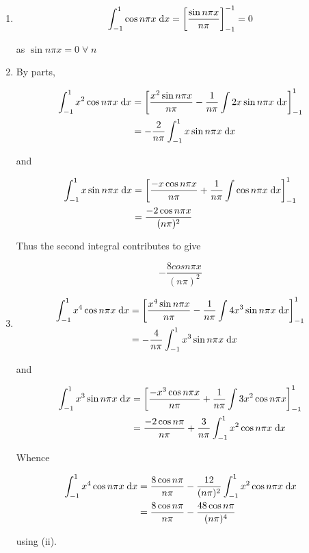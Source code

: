 \documentclass[a4paper]{article}
\begin{document}
\begin{enumerate}
	\item  \[ \int_{-1}^{1} \cos  n \pi x   \; \mathrm{d} x = \left[ \frac{\sin n \pi x}{n \pi} \right]_{-1}^{-1} = 0  \]
	
	as $ \sin n \pi x = 0 \; \forall \; n $
	
	\item By parts, 
	
	\begin{align*}
	\int_{-1}^{1} x^{2} \cos  n \pi x   \; \mathrm{d} x & = \left[ \frac{x^{2} \sin n \pi x}{n \pi} - \frac{1}{n \pi }\int 2x \sin n \pi x \; \mathrm{d} x \right]_{-1}^{1}  \\
	& = - \frac{2}{n \pi} \int_{-1}^{1} x \sin n \pi x \; \mathrm{d} x
	\end{align*}
	
	and
	
	\begin{align*}
	\int_{-1}^{1} x \sin n \pi x \; \mathrm{d} x & = \left[  \frac{- x \cos n \pi x}{n \pi} + \frac{1}{n \pi} \int \cos n \pi x \; \mathrm{d} x   \right]_{-1}^{1}  \\
	& = \frac{-2 \cos n \pi x }{(n \pi )^{2}}
	\end{align*}
	
	Thus the second integral contributes to give
	
	\[ - \frac{8 cos n \pi x}{(n \pi)^{2}} \]
	
	
	\item 
	
	\begin{align*}
	\int_{-1}^{1} x^{4} \cos  n \pi x  \; \mathrm{d} x & = \left[ \frac{x^{4} \sin n \pi x}{n \pi} - \frac{1}{n \pi }\int 4x^{3} \sin n \pi x \; \mathrm{d} x  \right]_{-1}^{1} \\
	& = - \frac{4}{n \pi} \int_{-1}^{1} x^{3} \sin n \pi x \; \mathrm{d} x
	\end{align*}
	
	and 
	
	\begin{align*}
	\int_{-1}^{1} x^{3} \sin n \pi x \; \mathrm{d} x & = \left[ \frac{-x^{3} \cos n \pi x}{n \pi} + \frac{1}{n \pi} \int 3 x^{2} \cos n \pi x \right]_{-1}^{1}  \\
	& = \frac{-2 \cos n \pi}{n \pi} + \frac{3}{n \pi} \int_{-1}^{1} x^{2} \cos n \pi x \; \mathrm{d} x
	\end{align*}
	
	Whence
	
	\begin{align*}
	\int_{-1}^{1} x^{4} \cos  n \pi x  \; \mathrm{d} x & = \frac{8\cos n \pi}{n \pi} - \frac{12}{(n \pi)^{2} } \int_{-1}^{1} x^{2} \cos n \pi x \; \mathrm{d} x  \\
	& = \frac{8\cos n \pi}{n \pi} - \frac{48 \cos n \pi }{(n \pi)^{4}}
	\end{align*}
	
	using (ii).
	
	
	
\end{enumerate}
\end{document}

